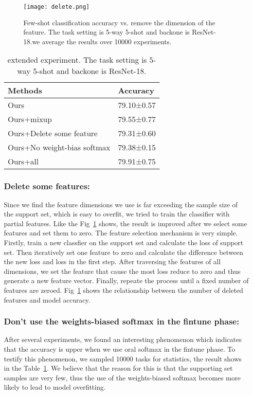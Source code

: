 \documentclass[runningheads]{llncs}
\begin{document}
\begin{figure}[h]%
  \centering  %
  \texttt{[image: delete.png]}  %
  \caption{Few-shot classification accuracy vs. remove the dimension of the feature. The task setting is 5-way 5-shot and backone is ResNet-18.we average the results over 10000 experiments.}  %
  \label{fig3}   %
\end{figure}

\begin{table}
\caption{extended experiment. The task setting is 5-way 5-shot and backone is ResNet-18.}\label{tab4}
\centering
\begin{tabular}{|l|l|}
\hline
Methods & Accuracy\\
\hline
Ours  &79.10±0.57\\
Ours+mixup  &79.55±0.77\\
Ours+Delete some feature & 79.31±0.60\\
Ours+No weight-bias softmax &79.38±0.15\\
Ours+all& 79.91±0.75\\
\hline
\end{tabular}
\end{table}

\subsubsection{Delete some features:}
Since we find the feature dimensions we use is far exceeding the sample size of the support set, which is easy to overfit, we tried to train the classifier with partial features. Like the Fig~\ref{fig3} shows, the result is improved after we select some features and set them to zero. The feature selection mechanism is very simple. Firstly, train a new classfier on the support set and calculate the loss of support set. Then iteratively set one feature to zero and  calculate the difference between the new loss and loss in the first step. After traversing the features of all dimensions, we set the feature that cause the most loss reduce to zero and thus generate a new feature vector. Finally, repeate the process until a fixed number of features are zeroed. Fig~\ref{fig3} shows the relationship between the number of deleted features and model accuracy.
\subsubsection{Don’t use the weights-biased softmax in the fintune phase:}
After several experiments, we found an interesting phenomenon which indicates that the accuracy is upper when we use oral softmax in the fintune phase. To testify this phenomenon, we sampled 10000 tasks for statistics, the result shows in the Table~\ref{tab4}. We believe that the reason for this is that the supporting set samples are very few, thus the use of the weights-biased softmax becomes more likely to lead to model overfitting.
\end{document}
